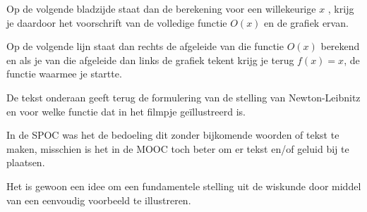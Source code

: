 \documentclass{article}
\begin{document}
Op de volgende bladzijde staat dan de berekening voor een willekeurige $x$ , krijg je daardoor het voorschrift van de volledige functie $O(x)$ en de grafiek ervan.

Op de volgende lijn staat dan rechts de afgeleide van die functie $O(x)$ berekend en als je van die afgeleide dan links de grafiek tekent krijg je terug $f(x)=x$, de functie waarmee je startte.

De tekst onderaan geeft terug de formulering van de stelling van Newton-Leibnitz en voor welke functie dat in het filmpje geïllustreerd is.

In de SPOC was het de bedoeling dit zonder bijkomende woorden of tekst te maken, misschien is het in de MOOC toch beter om er tekst en/of geluid bij te plaatsen.

Het is gewoon een idee om een fundamentele stelling uit de wiskunde door middel van een eenvoudig voorbeeld te illustreren. 
\end{document}
